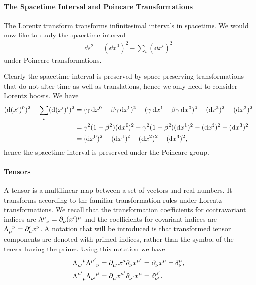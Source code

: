 \paragraph{The Spacetime Interval and Poincare Transformations}
The Lorentz transform transforms infinitesimal intervals in spacetime. We would now like to study the spacetime interval
\begin{align*}
	\dd{s}^{2} = (\dd{x^{0}})^{2} - \sum\limits_{i}(\dd{x^{i}})^{2}
\end{align*}
under Poincare transformations.

Clearly the spacetime interval is preserved by space-preserving transformations that do not alter time as well as translations, hence we only need to consider Lorentz boosts. We have
\begin{align*}
	(\dd{(x^{\prime})^{0}})^{2} - \sum\limits_{i}(\dd{(x^{\prime})^{i}})^{2} &= (\gamma\dd{x^{0}} - \beta\gamma\dd{x^{1}})^{2} - (\gamma\dd{x^{1}} - \beta\gamma\dd{x^{0}})^{2} - (\dd{x^{2}})^{2} - (\dd{x^{3}})^{2} \\
	                                                           &= \gamma^{2}(1 - \beta^{2})(\dd{x^{0}})^{2} - \gamma^{2}(1 - \beta^{2})(\dd{x^{1}})^{2} - (\dd{x^{2}})^{2} - (\dd{x^{3}})^{2} \\
	                                                           &= (\dd{x^{0}})^{2} - (\dd{x^{1}})^{2} - (\dd{x^{2}})^{2} - (\dd{x^{3}})^{2},
\end{align*}
hence the spacetime interval is preserved under the Poincare group.

\paragraph{Tensors}
A tensor is a multilinear map between a set of vectors and real numbers. It transforms according to the familiar transformation rules under Lorentz transformations. We recall that the transformation coefficients for contravariant indices are $\trcou{\mu}{\nu} = \del{\nu}{(x\p)^{\mu}}$ and the coefficients for covariant indices are $\trcod{\mu}{\nu} = \del[\prime]{\mu}{x^{\nu}}$. A notation that will be introduced is that transformed tensor components are denoted with primed indices, rather than the symbol of the tensor having the prime. Using this notation we have
\begin{align*}
	\trcod{\mu\p}{\mu}\trcou{\mu\p}{\nu} &= \del{\mu\p}{x^{\mu}}\del{\nu}{x^{\mu\p}} = \del{\nu}{x^{\mu}} = \kdelta{\mu}{\nu}, \\
	\trcou{\mu\p}{\mu}\trcod{\nu\p}{\mu} &= \del{\mu}{x^{\mu\p}}\del{\nu\p}{x^{\mu}} = \kdelta{\mu\p}{\nu\p}.
\end{align*}

